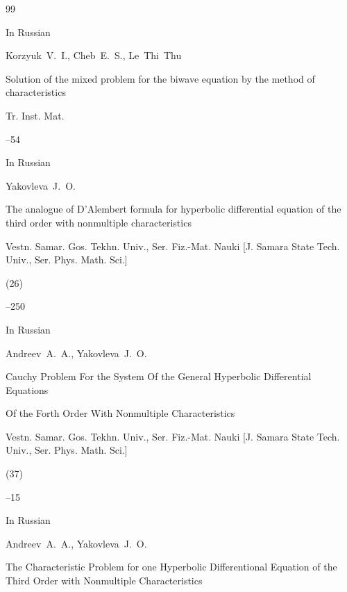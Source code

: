 \begin{thebibliography}{99}

\lang In Russian

\by Korzyuk~V.~I., Cheb~E.~S., Le~Thi~Thu

\paper Solution of the mixed problem for the biwave equation by the method of characteristics

\jour Tr. Inst. Mat.




--54




\lang In Russian

\by Yakovleva~J.~O.

\paper The analogue of D'Alembert formula for hyperbolic differential equation of the third order with nonmultiple characteristics

\jour Vestn. Samar. Gos. Tekhn. Univ., Ser. Fiz.-Mat. Nauki \rm [J. Samara State Tech. Univ., Ser. Phys. Math. Sci.]


(26)

--250





\lang In Russian

\by Andreev~A.~A., Yakovleva~J.~O.

\paper Cauchy Problem For the System Of the General Hyperbolic Differential Equations

Of the Forth Order With Nonmultiple Characteristics

\jour Vestn. Samar. Gos. Tekhn. Univ., Ser. Fiz.-Mat. Nauki \rm [J. Samara State Tech. Univ., Ser. Phys. Math. Sci.]


(37)

--15







\lang In Russian

\by Andreev~A.~A., Yakovleva~J.~O.

\paper The Characteristic Problem for one Hyperbolic Differentional Equation of the Third Order with Nonmultiple Characteristics


\end{thebibliography}
